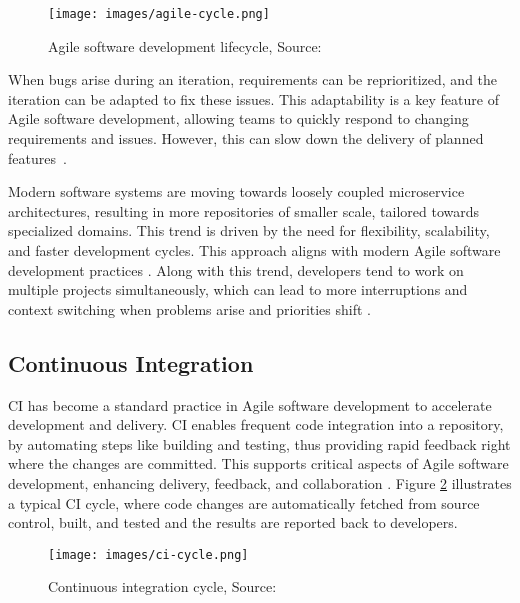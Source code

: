 \begin{figure}[H]
    \centering
    \texttt{[image: images/agile-cycle.png]}
    \caption{Agile software development lifecycle, Source: \cite{7MistakesIve2020}}
    \label{fig:agile-cycle}
\end{figure}

When bugs arise during an iteration, requirements can be reprioritized, and the iteration can be adapted to fix these issues. This adaptability is a key feature of Agile software development, allowing teams to quickly respond to changing requirements and issues. However, this can slow down the delivery of planned features~\cite{HowDoesAgile12:10:13+00:00}.

Modern software systems are moving towards loosely coupled microservice architectures, resulting in more repositories of smaller scale, tailored towards specialized domains. This trend is driven by the need for flexibility, scalability, and faster development cycles. This approach aligns with modern Agile software development practices \cite{francescoResearchArchitectingMicroservices2017}. Along with this trend, developers tend to work on multiple projects simultaneously, which can lead to more interruptions and context switching when problems arise and priorities shift \cite{tregubovImpactTaskSwitching2017, vasilescuSkyNotLimit2016}.

\subsection{Continuous Integration}

\Acf{CI} has become a standard practice in Agile software development to accelerate development and delivery. CI enables frequent code integration into a repository, by automating steps like building and testing, thus providing rapid feedback right where the changes are committed. This supports critical aspects of Agile software development, enhancing delivery, feedback, and collaboration \cite{ugwuezeContinuousIntegrationDeployment2024}. Figure \ref{fig:ci-cycle} illustrates a typical CI cycle, where code changes are automatically fetched from source control, built, and tested and the results are reported back to developers.

\begin{figure}[H]
    \centering
    \texttt{[image: images/ci-cycle.png]}
    \caption{Continuous integration cycle, Source:~\cite{lovettTop12Benefits2023}}
    \label{fig:ci-cycle}
\end{figure}

